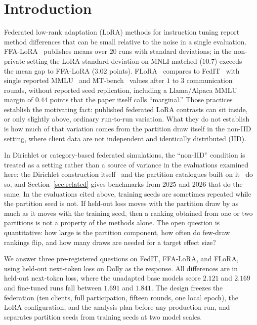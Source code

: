 \section{Introduction}
\label{sec:intro}

Federated low-rank adaptation (LoRA) methods for instruction tuning report method differences that can be small relative to the noise in a single evaluation. FFA-LoRA~\cite{sun2024ffalora} publishes means over $20$ runs with standard deviations; in the non-private setting the LoRA standard deviation on MNLI-matched ($10.7$) exceeds the mean gap to FFA-LoRA ($3.02$ points). FLoRA~\cite{wang2024flora} compares to FedIT~\cite{zhang2024fedit} with single reported MMLU~\cite{hendrycks2021mmlu} and MT-bench~\cite{zheng2023judging} values after $1$ to $3$ communication rounds, without reported seed replication, including a Llama/Alpaca MMLU margin of $0.44$ points that the paper itself calls ``marginal.'' Those practices establish the motivating fact: published federated LoRA contrasts can sit inside, or only slightly above, ordinary run-to-run variation. What they do not establish is how much of that variation comes from the partition draw itself in the non-IID setting, where client data are not independent and identically distributed (IID).

In Dirichlet or category-based federated simulations, the ``non-IID'' condition is
treated as a setting rather than a source of variance in the evaluations examined here:
the Dirichlet construction itself~\cite{hsu2019measuring} and the partition catalogues
built on it~\cite{li2022niidbench} do so, and Section~\ref{sec:related} gives benchmarks
from 2025 and 2026 that do the same. In the evaluations cited above, training seeds are sometimes repeated while the partition seed is not. If held-out loss moves with the partition draw by as much as it moves with the training seed, then a ranking obtained from one or two partitions is not a property of the methods alone. The open question is quantitative: how large is the partition component, how often do few-draw rankings flip, and how many draws are needed for a target effect size?

We answer three pre-registered questions on FedIT, FFA-LoRA, and FLoRA, using held-out next-token loss on Dolly as the response. All differences are in held-out next-token loss, where the unadapted base models score $2.121$ and $2.169$ and fine-tuned runs fall between $1.691$ and $1.841$. The design freezes the federation (ten clients, full participation, fifteen rounds, one local epoch), the LoRA configuration, and the analysis plan before any production run, and separates partition seeds from training seeds at two model scales.


